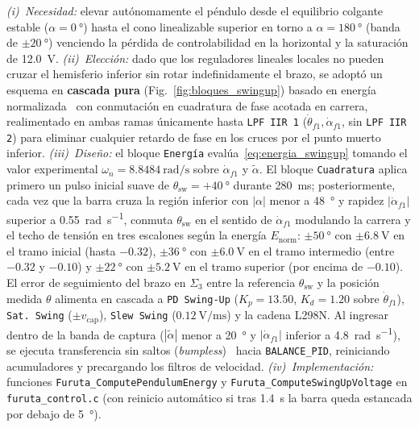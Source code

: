\textit{(i)~Necesidad:} elevar autónomamente el péndulo desde el equilibrio colgante estable ($\alpha=\qty{0}{\degree}$) hasta el cono linealizable superior en torno a $\alpha=\qty{180}{\degree}$ (banda de $\pm\qty{20}{\degree}$) venciendo la pérdida de controlabilidad en la horizontal y la saturación de \qty{12.0}{\volt}.
\textit{(ii)~Elección:} dado que los reguladores lineales locales no pueden cruzar el hemisferio inferior sin rotar indefinidamente el brazo, se adoptó un esquema en \textbf{cascada pura} (Fig.~\ref{fig:bloques_swingup}) basado en energía normalizada~\cite{astrom2000,spong1995} con conmutación en cuadratura de fase acotada en carrera, realimentado en ambas ramas únicamente hasta \texttt{LPF IIR 1} ($\dot{\theta}_{f1}, \dot{\alpha}_{f1}$, sin \texttt{LPF IIR 2}) para eliminar cualquier retardo de fase en los cruces por el punto muerto inferior.
\textit{(iii)~Diseño:} el bloque \texttt{Energía} evalúa~\eqref{eq:energia_swingup} tomando el valor experimental $\omega_n=\qty{8.8484}{\radian\per\second}$ sobre $\dot{\alpha}_{f1}$ y $\tilde{\alpha}$. El bloque \texttt{Cuadratura} aplica primero un pulso inicial suave de $\theta_{\text{sw}}=+\qty{40}{\degree}$ durante \qty{280}{\milli\second}; posteriormente, cada vez que la barra cruza la región inferior con $|\alpha|$ menor a \qty{48}{\degree} y rapidez $|\dot{\alpha}_{f1}|$ superior a \qty{0.55}{\radian\per\second}, conmuta $\theta_{\text{sw}}$ en el sentido de $\dot{\alpha}_{f1}$ modulando la carrera y el techo de tensión en tres escalones según la energía $E_{\text{norm}}$: $\pm\qty{50}{\degree}$ con $\pm\qty{6.8}{\volt}$ en el tramo inicial (hasta $-0.32$), $\pm\qty{36}{\degree}$ con $\pm\qty{6.0}{\volt}$ en el tramo intermedio (entre $-0.32$ y $-0.10$) y $\pm\qty{22}{\degree}$ con $\pm\qty{5.2}{\volt}$ en el tramo superior (por encima de $-0.10$). El error de seguimiento del brazo en $\Sigma_3$ entre la referencia $\theta_{\text{sw}}$ y la posición medida $\theta$ alimenta en cascada a \texttt{PD Swing-Up} ($K_p=13.50$, $K_d=1.20$ sobre $\dot{\theta}_{f1}$), \texttt{Sat. Swing} ($\pm v_{\text{cap}}$), \texttt{Slew Swing} ($\qty{0.12}{\volt\per\milli\second}$) y la cadena L298N. Al ingresar dentro de la banda de captura ($|\tilde{\alpha}|$ menor a \qty{20}{\degree} y $|\dot{\alpha}_{f1}|$ inferior a \qty{4.8}{\radian\per\second}), se ejecuta transferencia sin saltos (\textit{bumpless})~\cite{Peng1996} hacia \texttt{BALANCE\_PID}, reiniciando acumuladores y precargando los filtros de velocidad.
\textit{(iv)~Implementación:} funciones \texttt{Furuta\_\allowbreak ComputePendulumEnergy} y \texttt{Furuta\_\allowbreak ComputeSwingUpVoltage} en \texttt{furuta\_control.c} (con reinicio automático si tras \qty{1.4}{\second} la barra queda estancada por debajo de \qty{5}{\degree}).

